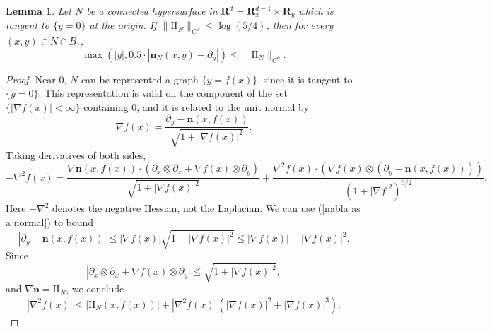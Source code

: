 \documentclass[reqno,11pt]{amsart}
\newcommand{\RR}{\mathbf{R}}
\newcommand{\Two}{\mathrm{I\!I}}
\newcommand{\normal}{\mathbf n}
\newtheorem{lemma}[theorem]{Lemma}
\theoremstyle{definition}
\numberwithin{equation}{section}
\begin{document}
\begin{lemma}\label{existence of tubes}
	Let $N$ be a connected hypersurface in $\RR^d = \RR^{d - 1}_x \times \RR_y$ which is tangent to $\{y = 0\}$ at the origin.
	If $\|\Two_N\|_{C^0} \leq \log(5/4)$, then for every $(x, y) \in N \cap B_1$,
	$$\max(|y|, 0.5 \cdot |\normal_N(x, y) - \partial_y|) \leq \|\Two_N\|_{C^0}.$$
\end{lemma}
\begin{proof}
	Near $0$, $N$ can be represented a graph $\{y = f(x)\}$, since it is tangent to $\{y = 0\}$.
	This representation is valid on the component of the set $\{|\nabla f(x)| < \infty\}$ containing $0$, and it is related to the unit normal by
\begin{equation}\label{nabla as a normal}
	\nabla f(x) = \frac{\partial_y - \normal(x, f(x))}{\sqrt{1 + |\nabla f(x)|^2}}.
\end{equation}
	Taking derivatives of both sides,
	$$-\nabla^2 f(x) = \frac{\nabla \normal(x, f(x)) \cdot (\partial_x \otimes \partial_x + \nabla f(x) \otimes \partial_y)}{\sqrt{1 + |\nabla f(x)|^2}} + \frac{\nabla^2 f(x) \cdot (\nabla f(x) \otimes (\partial_y - \normal(x, f(x))))}{(1 + |\nabla f|^2)^{3/2}}.$$
	Here $-\nabla^2$ denotes the negative Hessian, not the Laplacian.
	We can use (\ref{nabla as a normal}) to bound
	$$|\partial_y - \normal(x, f(x))| \leq |\nabla f(x)|\sqrt{1 + |\nabla f(x)|^2} \leq |\nabla f(x)| + |\nabla f(x)|^2.$$
	Since
	$$|\partial_x \otimes \partial_x + \nabla f(x) \otimes \partial_y| \leq \sqrt{1 + |\nabla f(x)|^2},$$
	and $\nabla \normal = \Two_N$, we conclude
\begin{equation}\label{bound Hessian by Two}
	|\nabla^2 f(x)| \leq |\Two_N(x, f(x))| + |\nabla^2 f(x)| (|\nabla f(x)|^2 + |\nabla f(x)|^3).
\end{equation}


\end{proof}
\end{document}

